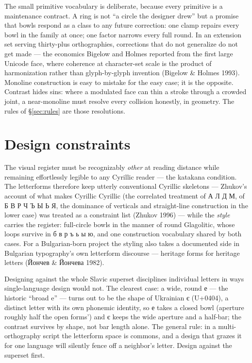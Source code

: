 \documentclass[11pt]{article}
\newcommand{\cz}[1]{{\chu #1}}
\begin{document}
The small primitive vocabulary is deliberate, because every primitive is a maintenance contract. A ring is not ``a circle the designer drew'' but a promise that bowls respond as a class to any future correction: one clamp repairs every bowl in the family at once; one factor narrows every full round. In an extension set serving thirty-plus orthographies, corrections that do not generalize do not get made — the economics Bigelow and Holmes reported from the first large Unicode face, where coherence at character-set scale is the product of harmonization rather than glyph-by-glyph invention (Bigelow \& Holmes 1993). Monoline construction is easy to mistake for the easy case; it is the opposite. Contrast hides sins: where a modulated face can thin a stroke through a crowded joint, a near-monoline must resolve every collision honestly, in geometry. The rules of \S\ref{sec:rules} are those resolutions.

\section{Design constraints}

The visual register must be recognizably \emph{other} at reading distance while remaining effortlessly legible to any Cyrillic reader — the katakana condition. The letterforms therefore keep utterly conventional Cyrillic skeletons — Zhukov's account of what makes Cyrillic Cyrillic (the correlated treatment of \cz{А Л Д М}, of \cz{Б В Р Ч Ъ Ы Ь Я}, the dominance of verticals and straight-line construction in the lower case) was treated as a constraint list (Zhukov 1996) — while the \emph{style} carries the register: full-circle bowls in the manner of round Glagolitic, whose loops survive in \cz{б в р ъ ь ы ю}, and one construction vocabulary shared by both cases. For a Bulgarian-born project the styling also takes a documented side in Bulgarian typography's own letterform discourse — heritage forms for heritage letters (Йончев \& Йончева 1982).

Designing against the whole Slavic superset disciplines individual letters in ways single-language design would not. The clearest case: a wide, round \cz{е} — the historic ``broad e'' — turns out to be the shape of Ukrainian \cz{є} (U+0404), a distinct letter with its own phonemic identity, so \cz{е} takes a closed bowl (aperture roughly half the open forms') and \cz{є} keeps the wide aperture and a half-bar; the contrast survives by shape, not bar length alone. The general rule: in a multi-orthography script the letterform space is commons, and a design that grazes it for one language will silently fence off a neighbor's letter. Design against the superset first.
\end{document}
